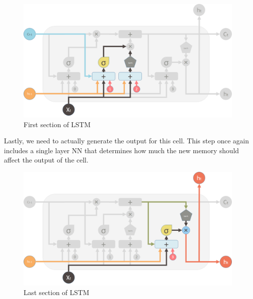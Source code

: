 \documentclass[12pt]{article}
\begin{document}
\begin{figure}[H]
  \includegraphics[width=\linewidth]{images/SecondValve.png}
  \caption{First section of LSTM}
\end{figure}

Lastly, we need to actually generate the output for this cell. This step once again includes a single layer NN that determines how much the new memory should affect the output of the cell.

\begin{figure}[H]
  \includegraphics[width=\linewidth]{images/LastValve.png}
  \caption{Last section of LSTM}
\end{figure}

\end{document}
